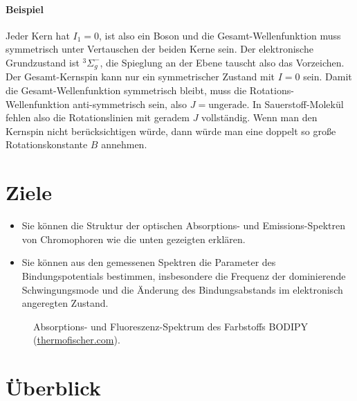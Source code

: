 \paragraph{Beispiel } Jeder Kern hat $I_1 = 0$, ist also ein Boson und die Gesamt-Wellenfunktion muss symmetrisch unter Vertauschen der beiden Kerne sein.  Der elektronische Grundzustand ist $^3\Sigma_g^-$, die Spieglung an der Ebene tauscht also das Vorzeichen. Der Gesamt-Kernspin kann nur ein symmetrischer Zustand mit $I = 0$ sein. Damit die Gesamt-Wellenfunktion symmetrisch bleibt, muss die Rotations-Wellenfunktion anti-symmetrisch sein, also $J = \text{ungerade}$. In Sauerstoff-Molekül   fehlen also die Rotationslinien mit geradem $J$ vollständig. Wenn man den Kernspin nicht berücksichtigen würde, dann würde man eine doppelt so große Rotationskonstante $B$ annehmen.





\section{Ziele}

\begin{itemize}
\item Sie können die Struktur der optischen Absorptions- und Emissions-Spektren von Chromophoren wie die unten gezeigten erklären.

\item Sie können aus den gemessenen Spektren die Parameter des Bindungspotentials bestimmen, insbesondere die Frequenz der dominierende Schwingungsmode und die Änderung des Bindungsabstands im elektronisch angeregten Zustand.

\end{itemize}


\begin{figure}
  \caption{Absorptions- und Fluoreszenz-Spektrum des Farbstoffs BODIPY  (\href{https://www.thermofisher.com/de/de/home/life-science/cell-analysis/labeling-chemistry/fluorescence-spectraviewer.html?SID=srch-svtool&UID=10001moh}{thermofischer.com}).}
\end{figure}



\section{Überblick}

